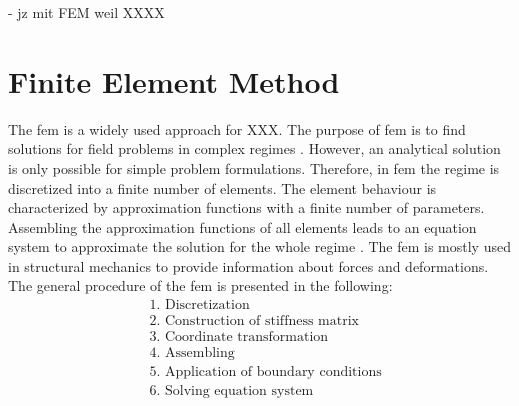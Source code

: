 



- jz mit FEM weil XXXX


\section{Finite Element Method} \label{sec: FEMBasics}

The \acrfull{fem} is a widely used approach for XXX. 
The purpose of \acrshort{fem} is to find solutions for field problems in complex regimes \cite{willner_vorlesungsskript_nodate}. However, an analytical solution is only possible for simple problem formulations. Therefore, in \acrshort{fem} the regime is discretized into a finite number of elements. The element behaviour is characterized by approximation functions with a finite number of parameters. Assembling the approximation functions of all elements leads to an equation system to approximate the solution for the whole regime \cite{jagota_finite_nodate}. The \acrshort{fem} is mostly used in structural mechanics to provide information about forces and deformations. The general procedure of the \acrshort{fem} is presented in the following: \\

\begin{align*}
    &\text{1. Discretization} \\
    &\text{2. Construction of stiffness matrix}\\ 
    &\text{3. Coordinate transformation} \\
    &\text{4. Assembling} \\
    &\text{5. Application of boundary conditions} \\
    &\text{6. Solving equation system}
\end{align*}

